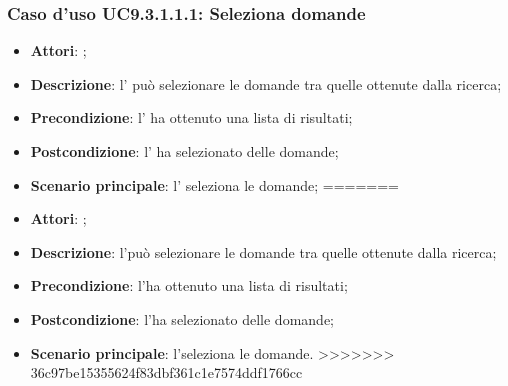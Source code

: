 		 \subsubsection{Caso d'uso UC9.3.1.1.1: Seleziona domande}
		 \label{UC9.3.1.1.1}
		 \begin{itemize}
<<<<<<< HEAD
		 	\item \textbf{Attori}: \uaupro{};
		 	\item \textbf{Descrizione}: l'\uaupro{} può selezionare le domande tra quelle ottenute dalla ricerca;
		 	\item \textbf{Precondizione}: l'\uaupro{} ha ottenuto una lista di risultati;
		 	\item \textbf{Postcondizione}: l'\uaupro{} ha selezionato delle domande; 
		 	\item \textbf{Scenario principale}: l'\uaupro{} seleziona le domande;
=======
		 	\item \textbf{Attori}: \uaupro;
		 	\item \textbf{Descrizione}: l'\uaupro può selezionare le domande tra quelle ottenute dalla ricerca;
		 	\item \textbf{Precondizione}: l'\uaupro ha ottenuto una lista di risultati;
		 	\item \textbf{Postcondizione}: l'\uaupro ha selezionato delle domande; 
		 	\item \textbf{Scenario principale}: l'\uaupro seleziona le domande.
>>>>>>> 36c97be15355624f83dbf361c1e7574ddf1766cc
		 \end{itemize}
		 
